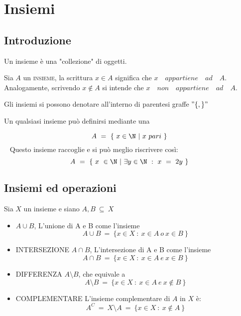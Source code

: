 \documentclass[../analisi.tex]{subfiles}
\begin{document}
\section{Insiemi}
\subsection{Introduzione}

\begin{defn}
	Un insieme è una "collezione" di oggetti.
\end{defn}
Sia $A$ un \textsc{insieme}, la scrittura $ x \in A $ significa che $x \quad
appartiene \quad ad \quad A$.\\
Analogamente, scrivendo $ x \notin A $ si intende che $ x \quad non \quad appartiene \quad ad \quad A$.

Gli insiemi  si possono denotare all'interno di parentesi graffe $ " \{ , \} " $

Un qualsiasi insieme può definirsi mediante una 

\begin{esem}
	\begin{equation}
	A\ =\ \{\ x \in \N\ |\ x\ pari\ \}
	\end{equation} 
	Questo insieme raccoglie  e si può meglio riscrivere così:
	\begin{equation}
	A\ =\ \{\ x\ \in \N\ |\ \exists y \in \N\ :\ x\ =\ 2y\ \}
	\end{equation}
\end{esem}

\subsection{Insiemi ed operazioni}
Sia $X$ un insieme e siano $A,B\ \subseteq\ X$
\begin{itemize}
	\item {} $A \cup B$, L'unione di A e B come l'insieme 
		\begin{equation}
			A \cup B\ =\ \{ x \in X\ :\ x\in A\ o\ x\in B\ \}
		\end{equation}
	\item \textsc{INTERSEZIONE} $A \cap B$, L'intersezione di A e B come l'insieme
		\begin{equation}
			A \cap B\ =\ \{ x \in X\ :\ x\in A\ e\ x\in B\ \}
		\end{equation}
	\item \textsc{DIFFERENZA} $A \setminus B$, che equivale a
		\begin{equation}
			A \setminus B\ =\ \{x \in X\ :\ x \in A\ e\ x \notin B\ \}
		\end{equation}
	\item \textsc{COMPLEMENTARE} L'insieme complementare di $A$ in $X$ è:
		\begin{equation}
			A^C\ =\ X \setminus A\ =\ \{x \in X\ :\ x \notin A\ \}
		\end{equation}
\end{itemize}
\end{document}
